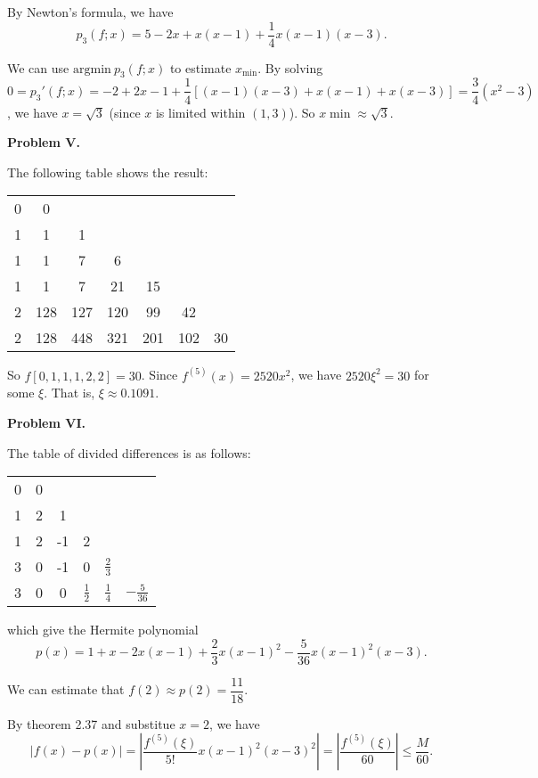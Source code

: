 \documentclass[UTF8]{ctexart}
\begin{document}
By Newton's formula, we have
\[p_3(f;x)=5-2x+x(x-1)+\dfrac14x(x-1)(x-3).\]

We can use $\mathrm{argmin}\ p_3(f;x)$ to estimate $x_{\min}$. By solving $0=p_3'(f;x)=-2+2x-1+\dfrac14[(x-1)(x-3)+x(x-1)+x(x-3)]=\dfrac34(x^2-3)$, we have $x=\sqrt3$ (since $x$ is limited within $(1,3)$). So $x\min\approx \sqrt3$.

\quad

\textbf{Problem V. }

The following table shows the result:

\begin{table}[htbp]
    \centering
    \begin{tabular}{c|cccccc}
        0 & 0 &  &  &  &  &  \\
        1 & 1 & 1 &  &  &  &  \\
        1 & 1 & 7 & 6 &  &  &  \\
        1 & 1 & 7 & 21 & 15 &  &  \\
        2 & 128 & 127 & 120 & 99 & 42 & \\
        2 & 128 & 448 & 321 & 201 & 102 & 30 \\
    \end{tabular}
\end{table}

So $f[0,1,1,1,2,2]=30$. Since $f^{(5)}(x)=2520x^2$, we have $2520\xi^2=30$ for some $\xi$. That is, $\xi \approx 0.1091$.

\quad

\textbf{Problem VI. }

The table of divided differences is as follows:

\begin{table}[H]
    \centering
    \begin{tabular}{c|ccccc}
        0 & 0 &  &  &  &    \\
        1 & 2 & 1 &  &  &    \\
        1 & 2 & -1 & 2 &  &    \\
        3 & 0 & -1 & 0 & $\frac23$ &    \\
        3 & 0 & 0 & $\frac12$ & $\frac14$ & $-\frac5{36}$ 
    \end{tabular}
\end{table}

which give the Hermite polynomial
\[p(x)=1+x-2x(x-1)+\dfrac23x(x-1)^2-\dfrac{5}{36}x(x-1)^2(x-3).\]

We can estimate that $f(2)\approx p(2)=\dfrac{11}{18}$.

By theorem 2.37 and substitue $x=2$, we have  
\[|f(x)-p(x)|=\left|\dfrac{f^{(5)}(\xi)}{5!}x(x-1)^2(x-3)^2\right|=\left|\dfrac{f^{(5)}(\xi)}{60}\right|\leqslant\dfrac{M}{60}.\]
\end{document}
